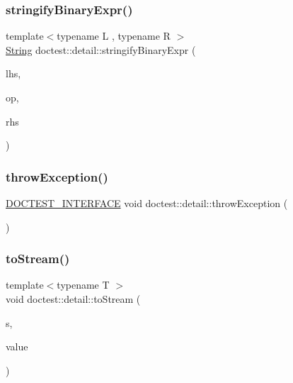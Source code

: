 \subsubsection{\texorpdfstring{stringify\+Binary\+Expr()}{stringifyBinaryExpr()}}
{\footnotesize\ttfamily template$<$typename L , typename R $>$ \\
\hyperlink{classdoctest_1_1_string}{String} doctest\+::detail\+::stringify\+Binary\+Expr (\begin{DoxyParamCaption}\item[{const \hyperlink{doctest_8h_af2901cafb023c57fb672ccb1bf14f2eb}{D\+O\+C\+T\+E\+S\+T\+\_\+\+R\+E\+F\+\_\+\+W\+R\+AP}(L)}]{lhs,  }\item[{const char $\ast$}]{op,  }\item[{const \hyperlink{doctest_8h_af2901cafb023c57fb672ccb1bf14f2eb}{D\+O\+C\+T\+E\+S\+T\+\_\+\+R\+E\+F\+\_\+\+W\+R\+AP}(R)}]{rhs }\end{DoxyParamCaption})}

\mbox{\label{namespacedoctest_1_1detail_a60ffd50b9ee7adfcafc078f333aac8b6}} 
\subsubsection{\texorpdfstring{throw\+Exception()}{throwException()}}
{\footnotesize\ttfamily \hyperlink{doctest_8h_a9c16ffc635ec47f07797d21ede26b1a5}{D\+O\+C\+T\+E\+S\+T\+\_\+\+I\+N\+T\+E\+R\+F\+A\+CE} void doctest\+::detail\+::throw\+Exception (\begin{DoxyParamCaption}{ }\end{DoxyParamCaption})}

\mbox{\label{namespacedoctest_1_1detail_a71b40611173c82709726b36715229179}} 
\subsubsection{\texorpdfstring{to\+Stream()}{toStream()}\hspace{0.1cm}{\footnotesize\ttfamily [1/16]}}
{\footnotesize\ttfamily template$<$typename T $>$ \\
void doctest\+::detail\+::to\+Stream (\begin{DoxyParamCaption}\item[{\hyperlink{doctest_8h_a116af65cb5e924b33ad9d9ecd7a783f3}{std\+::ostream} $\ast$}]{s,  }\item[{const T \&}]{value }\end{DoxyParamCaption})}

